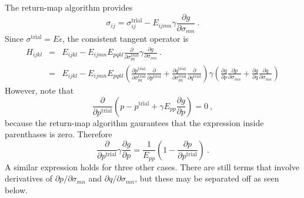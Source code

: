 \documentclass[]{scrreprt}
\begin{document}
The return-map algorithm provides
\begin{equation}
\sigma_{ij} = \sigma_{ij}^{\mathrm{trial}} - E_{ijmn}\gamma
\frac{\partial g}{\partial \sigma_{mn}} \ .
\end{equation}
Since $\sigma^{\mathrm{trial}} = E\epsilon$, the consistent tangent
operator is
\begin{eqnarray}
H_{ijkl} & = & E_{ijkl} -
E_{ijmn}E_{pqkl}\frac{\partial}{\partial\sigma_{pq}^{\mathrm{trial}}}
\gamma \frac{\partial g}{\partial\sigma_{mn}} \ . \nonumber \\
& = & E_{ijkl} - E_{ijmn}E_{pqkl} \left(
\frac{\partial
  p^{\mathrm{trial}}}{\partial\sigma_{pq}^{\mathrm{trial}}}
\frac{\partial}{\partial p^{\mathrm{trial}}}
+ \frac{\partial
  q^{\mathrm{trial}}}{\partial\sigma_{pq}^{\mathrm{trial}}}
\frac{\partial}{\partial q^{\mathrm{trial}}} \right)
\gamma
\left(
\frac{\partial g}{\partial p}\frac{\partial p}{\partial \sigma_{mn}}
+
\frac{\partial g}{\partial q}\frac{\partial q}{\partial \sigma_{mn}}
\right)
\end{eqnarray}
However, note that
\begin{equation}
\frac{\partial}{\partial p^{\mathrm{trial}}} \left( p -
p^{\mathrm{trial}} + \gamma E_{pp}\frac{\partial g}{\partial p}
\right) = 0 \ ,
\end{equation}
because the return-map algorithm gaurantees that the expression inside
parenthases is zero.  Therefore
\begin{equation}
\frac{\partial}{\partial p^{\mathrm{trial}}}\gamma\frac{\partial
  g}{\partial p} = \frac{1}{E_{pp}} \left( 1- \frac{\partial
  p}{\partial p^{\mathrm{trial}}} \right) \ .
\end{equation}
A similar expression holds for three other cases.  There are still
terms that involve derivatives of $\partial p/\partial \sigma_{mn}$
  and $\partial q/\partial\sigma_{mn}$, but these may be separated off
  as seen below.
\end{document}

